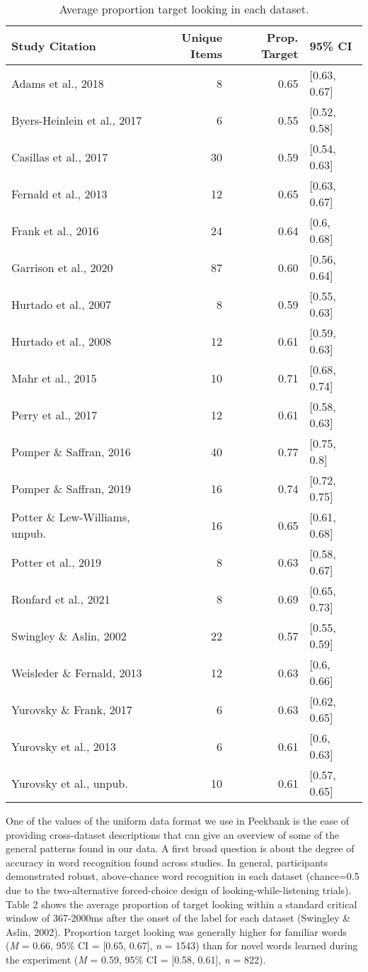 \documentclass[
  english,
  man,floatsintext]{apa6}
\begin{document}
\begin{table}[H]
\centering
\begingroup\fontsize{9pt}{10pt}\selectfont
\begin{tabular}{lrrl}
  \hline
Study Citation & Unique Items & Prop. Target & 95\% CI \\ 
  \hline
Adams et al., 2018 & 8 & 0.65 & [0.63, 0.67] \\ 
  Byers-Heinlein et al., 2017 & 6 & 0.55 & [0.52, 0.58] \\ 
  Casillas et al., 2017 & 30 & 0.59 & [0.54, 0.63] \\ 
  Fernald et al., 2013 & 12 & 0.65 & [0.63, 0.67] \\ 
  Frank et al., 2016 & 24 & 0.64 & [0.6, 0.68] \\ 
  Garrison et al., 2020 & 87 & 0.60 & [0.56, 0.64] \\ 
  Hurtado et al., 2007 & 8 & 0.59 & [0.55, 0.63] \\ 
  Hurtado et al., 2008 & 12 & 0.61 & [0.59, 0.63] \\ 
  Mahr et al., 2015 & 10 & 0.71 & [0.68, 0.74] \\ 
  Perry et al., 2017 & 12 & 0.61 & [0.58, 0.63] \\ 
  Pomper \& Saffran, 2016 & 40 & 0.77 & [0.75, 0.8] \\ 
  Pomper \& Saffran, 2019 & 16 & 0.74 & [0.72, 0.75] \\ 
  Potter \& Lew-Williams, unpub. & 16 & 0.65 & [0.61, 0.68] \\ 
  Potter et al., 2019 & 8 & 0.63 & [0.58, 0.67] \\ 
  Ronfard et al., 2021 & 8 & 0.69 & [0.65, 0.73] \\ 
  Swingley \& Aslin, 2002 & 22 & 0.57 & [0.55, 0.59] \\ 
  Weisleder \& Fernald, 2013 & 12 & 0.63 & [0.6, 0.66] \\ 
  Yurovsky \& Frank, 2017 & 6 & 0.63 & [0.62, 0.65] \\ 
  Yurovsky et al., 2013 & 6 & 0.61 & [0.6, 0.63] \\ 
  Yurovsky et al., unpub. & 10 & 0.61 & [0.57, 0.65] \\ 
   \hline
\end{tabular}
\endgroup
\caption{Average proportion target looking in each dataset.} 
\end{table}

One of the values of the uniform data format we use in Peekbank is the ease of providing cross-dataset descriptions that can give an overview of some of the general patterns found in our data.
A first broad question is about the degree of accuracy in word recognition found across studies.
In general, participants demonstrated robust, above-chance word recognition in each dataset (chance=0.5 due to the two-alternative forced-choice design of looking-while-listening trials).
Table 2 shows the average proportion of target looking within a standard critical window of 367-2000ms after the onset of the label for each dataset (Swingley \& Aslin, 2002).
Proportion target looking was generally higher for familiar words (\emph{M} = 0.66, 95\% CI = {[}0.65, 0.67{]}, \emph{n} = 1543) than for novel words learned during the experiment (\emph{M} = 0.59, 95\% CI = {[}0.58, 0.61{]}, \emph{n} = 822).
\end{document}
